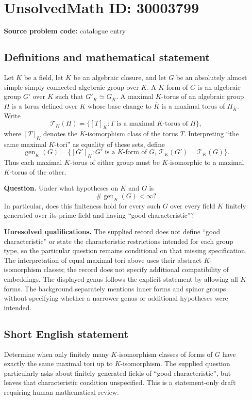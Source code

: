 \documentclass[11pt]{article}
\begin{document}
\section*{UnsolvedMath ID: 30003799}
\textbf{Source problem code:} catalogue entry
\subsection{Definitions and mathematical statement}
Let \(K\) be a field, let \(\overline K\) be an algebraic closure, and let \(G\) be an absolutely almost simple simply connected algebraic group over \(K\). A \(K\)-form of \(G\) is an algebraic group \(G'\) over \(K\) such that \(G'_{\overline K}\simeq G_{\overline K}\). A maximal \(K\)-torus of an algebraic group \(H\) is a torus defined over \(K\) whose base change to \(\overline K\) is a maximal torus of \(H_{\overline K}\). Write
\[
\mathcal T_K(H)=\{[T]_K:T\text{ is a maximal }K\text{-torus of }H\},
\]
where \([T]_K\) denotes the \(K\)-isomorphism class of the torus \(T\). Interpreting ``the same maximal \(K\)-tori'' as equality of these sets, define
\[
\operatorname{gen}_K(G)=\{[G']_K:G'\text{ is a }K\text{-form of }G,\ \mathcal T_K(G')=\mathcal T_K(G)\}.
\]
Thus each maximal \(K\)-torus of either group must be \(K\)-isomorphic to a maximal \(K\)-torus of the other.

\textbf{Question.} Under what hypotheses on \(K\) and \(G\) is
\[
\#\operatorname{gen}_K(G)<\infty?
\]
In particular, does this finiteness hold for every such \(G\) over every field \(K\) finitely generated over its prime field and having ``good characteristic''?

\textbf{Unresolved qualifications.} The supplied record does not define ``good characteristic'' or state the characteristic restrictions intended for each group type, so the particular question remains conditional on that missing specification. The interpretation of equal maximal tori above uses their abstract \(K\)-isomorphism classes; the record does not specify additional compatibility of embeddings. The displayed genus follows the explicit statement by allowing all \(K\)-forms. The background separately mentions inner forms and spinor groups without specifying whether a narrower genus or additional hypotheses were intended.
\subsection{Short English statement}
Determine when only finitely many \(K\)-isomorphism classes of forms of \(G\) have exactly the same maximal tori up to \(K\)-isomorphism. The supplied question particularly asks about finitely generated fields of ``good characteristic'', but leaves that characteristic condition unspecified. This is a statement-only draft requiring human mathematical review.
\end{document}
